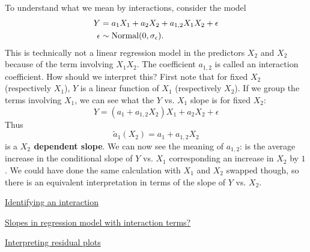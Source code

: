 To understand what we mean by {\dfn interactions}, consider the model 
\begin{align}
Y &= a_1X_1 + a_2X_2 + a_{1,2}X_1X_2 + \epsilon \\
\epsilon &\sim {\rm Normal}(0,\sigma_{\epsilon}).
\end{align}
This is technically not a linear regression model in the predictors $X_2$ and $X_2$ because of the term involving $X_1X_2$. The coefficient $a_{1,2}$ is called an interaction coefficient. How should we interpret this? First note that for fixed $X_2$ (respectively $X_1$), $Y$ is a linear function of $X_1$ (respectively $X_2$). If we group the terms involving $X_1$, we can see what the $Y$ vs. $X_1$ slope is for fixed $X_2$: 
\begin{equation}
Y = (a_1 + a_{1,2}X_2)X_1 + a_2 X_2 +  \epsilon
\end{equation}
Thus 
\begin{equation}
\tilde{a}_1(X_2) = a_1 + a_{1,2}X_2
\end{equation}
is a {\bf $X_2$ dependent slope}. We can now see the meaning of $a_{1,2}$: is the average increase in the conditional slope of $Y$ vs. $X_1$ corresponding an increase in $X_2$ by $1$. We could have done the same calculation with $X_1$ and $X_2$ swapped though, so there is an equivalent interpretation in terms of the slope of $Y$ vs. $X_2$. 



\begin{example}
\href{https://colab.research.google.com/drive/1bBeb3k5xEjGInFtjhB7X8B0LXqkGI0Tn?usp=sharing}{Identifying an interaction}
\end{example}


\begin{example}
\href{https://colab.research.google.com/drive/1bBeb3k5xEjGInFtjhB7X8B0LXqkGI0Tn#scrollTo=brPdGI7K9-7h&line=3&uniqifier=1}{Slopes in regression model with interaction terms?}
\end{example}


\begin{exercise}
\href{https://colab.research.google.com/drive/1bBeb3k5xEjGInFtjhB7X8B0LXqkGI0Tn#scrollTo=kTHIvvZba6ai&line=1&uniqifier=1}{Interpreting residual plots}
\end{exercise}










